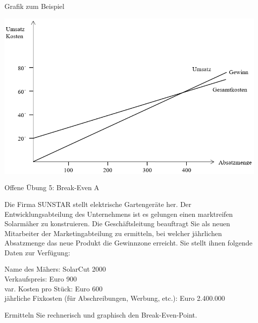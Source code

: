 \documentclass[12pt,ngerman,a4paper,ignorenonframetext,]{beamer}
\begin{document}
\begin{frame}{Grafik zum Beispiel}
\protect\hypertarget{grafik-zum-beispiel}{}

\begin{center}\includegraphics[width=0.7\linewidth]{./images/Marketingcontrolling/Breakeven2} \end{center}

\end{frame}

\begin{frame}{Offene Übung 5: Break-Even A}
\protect\hypertarget{offene-ubung-5-break-even-a}{}

Die Firma SUNSTAR stellt elektrische Gartengeräte her. Der
Entwicklungsabteilung des Unternehmens ist es gelungen einen marktreifen
Solarmäher zu konstruieren. Die Geschäftsleitung beauftragt Sie als
neuen Mitarbeiter der Marketingabteilung zu ermitteln, bei welcher
jährlichen Absatzmenge das neue Produkt die Gewinnzone erreicht. Sie
stellt ihnen folgende Daten zur Verfügung:

Name des Mähers: SolarCut 2000\\
Verkaufspreis: Euro 900\\
var. Kosten pro Stück: Euro 600\\
jährliche Fixkosten (für Abschreibungen, Werbung, etc.): Euro 2.400.000

Ermitteln Sie rechnerisch und graphisch den Break-Even-Point.


\end{frame}
\end{document}
